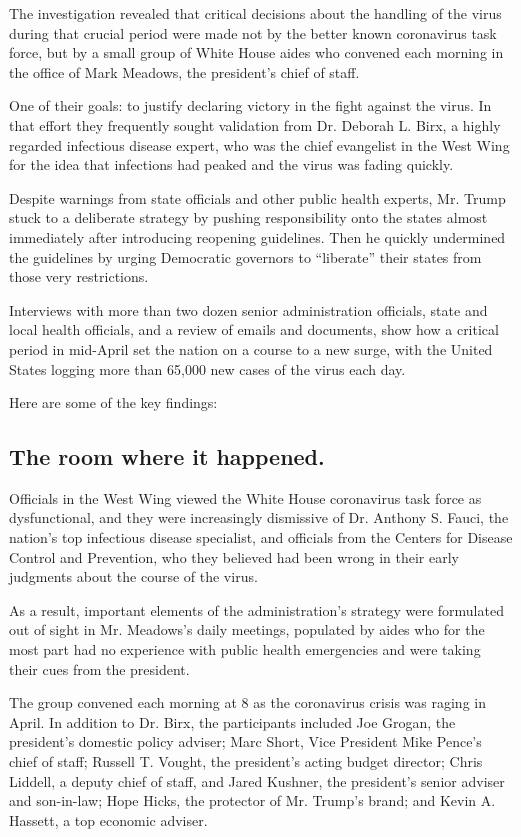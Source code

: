 The investigation revealed that critical decisions about the handling of
the virus during that crucial period were made not by the better known
coronavirus task force, but by a small group of White House aides who
convened each morning in the office of Mark Meadows, the president's
chief of staff.

One of their goals: to justify declaring victory in the fight against
the virus. In that effort they frequently sought validation from Dr.
Deborah L. Birx, a highly regarded infectious disease expert, who was
the chief evangelist in the West Wing for the idea that infections had
peaked and the virus was fading quickly.

Despite warnings from state officials and other public health experts,
Mr. Trump stuck to a deliberate strategy by pushing responsibility onto
the states almost immediately after introducing reopening guidelines.
Then he quickly undermined the guidelines by urging Democratic governors
to ``liberate'' their states from those very restrictions.

Interviews with more than two dozen senior administration officials,
state and local health officials, and a review of emails and documents,
show how a critical period in mid-April set the nation on a course to a
new surge, with the United States logging more than 65,000 new cases of
the virus each day.

Here are some of the key findings:

\hypertarget{the-room-where-it-happened}{%
\subsection{The room where it
happened.}\label{the-room-where-it-happened}}

Officials in the West Wing viewed the White House coronavirus task force
as dysfunctional, and they were increasingly dismissive of Dr. Anthony
S. Fauci, the nation's top infectious disease specialist, and officials
from the Centers for Disease Control and Prevention, who they believed
had been wrong in their early judgments about the course of the virus.

As a result, important elements of the administration's strategy were
formulated out of sight in Mr. Meadows's daily meetings, populated by
aides who for the most part had no experience with public health
emergencies and were taking their cues from the president.

The group convened each morning at 8 as the coronavirus crisis was
raging in April. In addition to Dr. Birx, the participants included Joe
Grogan, the president's domestic policy adviser; Marc Short, Vice
President Mike Pence's chief of staff; Russell T. Vought, the
president's acting budget director; Chris Liddell, a deputy chief of
staff, and Jared Kushner, the president's senior adviser and son-in-law;
Hope Hicks, the protector of Mr. Trump's brand; and Kevin A. Hassett, a
top economic adviser.

